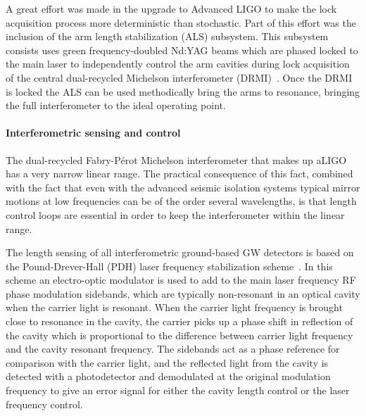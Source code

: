 A great effort was made in the upgrade to Advanced LIGO to make the lock acquisition process more deterministic than 
stochastic. Part of this effort was the inclusion of the arm length stabilization (ALS) subsystem. This subsystem consists uses 
green frequency-doubled Nd:YAG beams which are phased locked to the main laser to independently control the arm cavities during 
lock acquisition of the central dual-recycled Michelson interferometer (DRMI)~\cite{Staley2014}. Once the DRMI is locked the ALS can be used 
methodically bring the arms to resonance, bringing the full interferometer to the ideal operating point.

\paragraph*{Interferometric sensing and control}
The dual-recycled Fabry-P\'{e}rot Michelson interferometer that makes up aLIGO has a very narrow linear range. 
The practical consequence of this fact, combined with the fact that even with the advanced seismic isolation systems typical 
mirror motions at low frequencies can be of the order several wavelengths, is that length control loops are essential in order 
to keep the interferometer within the linear range. 

The length sensing of all interferometric ground-based GW detectors is based on the Pound-Drever-Hall (PDH) laser 
frequency stabilization scheme~\cite{PDH}. 
In this scheme an electro-optic modulator is used to add to the main laser frequency RF phase modulation sidebands, 
which are typically non-resonant in an optical cavity when the carrier light is resonant.
When the carrier light frequency is brought close to resonance in the cavity, 
the carrier picks up a phase shift in reflection of the cavity which is proportional to the difference between carrier light 
frequency and the cavity resonant frequency. The sidebands act as a phase reference for comparison with the 
carrier light, and the reflected light 
from the cavity is detected with a photodetector and demodulated at the original modulation frequency to give an error 
signal for either the cavity length control or the laser frequency control. 

